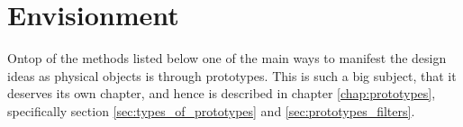 \section{Envisionment} \label{sec:envisionment}
Ontop of the methods listed below one of the main ways to manifest the design ideas as physical objects is through prototypes. This is such a big subject, that it deserves its own chapter, and hence is described in chapter \ref{chap:prototypes}, specifically section \ref{sec:types_of_prototypes} and \ref{sec:prototypes_filters}.






